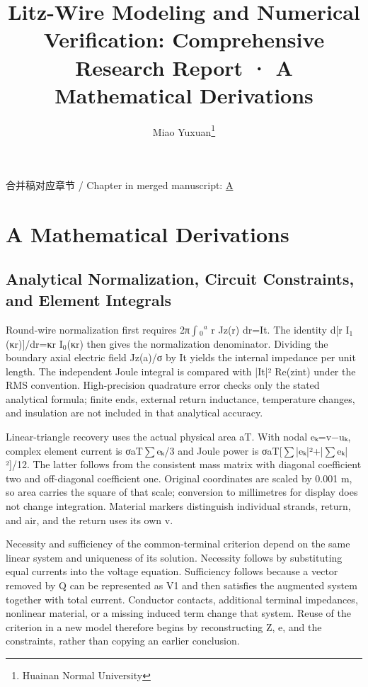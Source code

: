 \documentclass[journal,10pt]{IEEEtran}
\begin{document}
\title{Litz-Wire Modeling and Numerical Verification: Comprehensive Research Report · A Mathematical Derivations}
\author{Miao Yuxuan\thanks{Huainan Normal University}}

\maketitle
\noindent 合并稿对应章节 / Chapter in merged manuscript: \href{report_en_ieee.pdf#chapter-A}{A}\par
\FloatBarrier
\section*{A Mathematical Derivations}
\hypertarget{chapter-A}{}
\subsection*{Analytical Normalization, Circuit Constraints, and Element Integrals}
\hypertarget{A.report_derivation.heading}{}
Round-wire normalization first requires 2π\(\int\)\(_0\)\(^a\) r Jz(r) dr=It. The identity d[r I\(_1\)(κr)]/dr=κr I\(_0\)(κr) then gives the normalization denominator. Dividing the boundary axial electric field Jz(a)/σ by It yields the internal impedance per unit length. The independent Joule integral is compared with |It|² Re(zint) under the RMS convention. High-precision quadrature error checks only the stated analytical formula; finite ends, external return inductance, temperature changes, and insulation are not included in that analytical accuracy.


Linear-triangle recovery uses the actual physical area aT. With nodal eₖ=v−uₖ, complex element current is σaT\(\sum\)eₖ/3 and Joule power is σaT[\(\sum\)|eₖ|²+|\(\sum\)eₖ|²]/12. The latter follows from the consistent mass matrix with diagonal coefficient two and off-diagonal coefficient one. Original coordinates are scaled by 0.001 m, so area carries the square of that scale; conversion to millimetres for display does not change integration. Material markers distinguish individual strands, return, and air, and the return uses its own v.


Necessity and sufficiency of the common-terminal criterion depend on the same linear system and uniqueness of its solution. Necessity follows by substituting equal currents into the voltage equation. Sufficiency follows because a vector removed by Q can be represented as V1 and then satisfies the augmented system together with total current. Conductor contacts, additional terminal impedances, nonlinear material, or a missing induced term change that system. Reuse of the criterion in a new model therefore begins by reconstructing Z, e, and the constraints, rather than copying an earlier conclusion.
\end{document}
